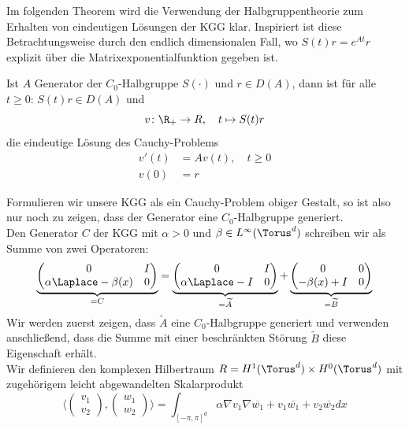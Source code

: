 Im folgenden Theorem wird die Verwendung der Halbgruppentheorie zum Erhalten von eindeutigen Lösungen der KGG klar. Inspiriert ist diese Betrachtungsweise durch den endlich dimensionalen Fall, wo $S(t)r=e^{At}r$ explizit über die Matrixexponentialfunktion gegeben ist.
\begin{maththeorem}
Ist $A$ Generator der $C_0$-Halbgruppe $S(\cdot)$ und $r\in D(A)$, dann ist für alle $t\ge 0\colon \,S(t)r\in D(A)$ und
\[v\colon \R_+\to R,\quad t\mapsto S(t)r\]
die eindeutige Lösung des Cauchy-Problems
\begin{equation}
\begin{split}
v'(t)&=Av(t),\quad t\ge 0\\
v(0)&=r
\end{split}
\end{equation}
\end{maththeorem}
Formulieren wir unsere KGG als ein Cauchy-Problem obiger Gestalt, so ist also nur noch zu zeigen, dass der Generator eine $C_0$-Halbgruppe generiert.\\
Den Generator $C$ der KGG mit $\alpha>0$ und $\beta\in L^\infty(\Torus^d)$ schreiben wir als Summe von zwei Operatoren:
\[\underbrace{\begin{pmatrix}0 & I\\ \alpha\Laplace -\beta(x) & 0\end{pmatrix}}_{=C}
=\underbrace{\begin{pmatrix}0 & I\\ \alpha\Laplace-I & 0\end{pmatrix}}_{=\widetilde{A}}
+\underbrace{\begin{pmatrix}0 & 0\\ -\beta(x)+I & 0\end{pmatrix}}_{=\widetilde{B}}\]
Wir werden zuerst zeigen, dass $\widetilde{A}$ eine $C_0$-Halbgruppe generiert und verwenden anschließend, dass die Summe mit einer beschränkten Störung $\widetilde{B}$ diese Eigenschaft erhält.\\[0.2cm]
Wir definieren den komplexen Hilbertraum $R=H^1(\Torus^d)\times H^0(\Torus^d)$ mit zugehörigem leicht abgewandelten Skalarprodukt 
\[\langle \begin{pmatrix}v_1\\v_2\end{pmatrix}, \begin{pmatrix}w_1\\w_2\end{pmatrix}\rangle =\int_{[-\pi,\pi]^d}\alpha \nabla v_1\nabla \overline{w_1}+v_1\overline{w_1}+ v_2\overline{w_2}dx\]
